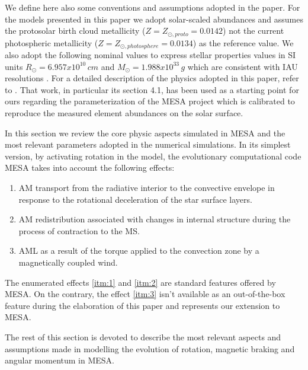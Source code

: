\documentclass[fleqn,usenatbib]{mnras}
\begin{document}
We define here also some conventions and assumptions adopted in the paper. For the models presented in this paper we adopt solar-scaled abundances and assumes the \citet{Asplund2009} protosolar birth cloud metallicity ($Z = Z_{\odot, proto} = 0.0142$) not the current photospheric metallicity ($Z = Z_{\odot, photosphere} = 0.0134$) as the reference value. We also adopt the following nominal values to express stellar properties values in SI units $R_{\odot} = 6.957x10^{10}\, cm$ and $M_{\odot} = 1.988x10^{33}\, g$ which are consistent with IAU resolutions \citep{Mamajek2015}. For a detailed description of the physics adopted in this paper, refer to \citet{Choi2016}. That work, in particular its section 4.1, has been used as a starting point for ours regarding the parameterization of the MESA project which is calibrated to reproduce the measured element abundances on the solar surface.\par

In this section we review the core physic aspects simulated in MESA and the most relevant parameters adopted in the numerical simulations. In its simplest version, by activating rotation in the model, the evolutionary computational code MESA takes into account the following effects:
\begin{enumerate}
    \item AM transport from the radiative interior to the convective envelope in response to the rotational deceleration of the star surface layers\label{itm:1}.
    \item AM redistribution associated with changes in internal structure during the process of contraction to the MS\label{itm:2}.
    \item AML as a result of the torque applied to the convection zone by a magnetically coupled wind\label{itm:3}.
\end{enumerate}

The enumerated effects \ref{itm:1} and \ref{itm:2} are standard features offered by MESA. On the contrary, the effect \ref{itm:3} isn't available as an out-of-the-box feature during the elaboration of this paper and represents our extension to MESA.


The rest of this section is devoted to describe the most relevant aspects and assumptions made in modelling the evolution of rotation, magnetic braking and angular momentum in MESA.\par
\end{document}
